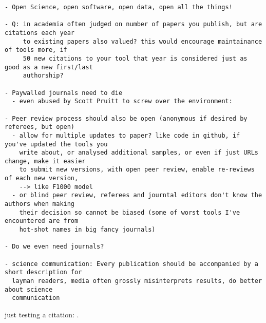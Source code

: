 \begin{verbatim}
- Open Science, open software, open data, open all the things!

- Q: in academia often judged on number of papers you publish, but are citations each year
     to existing papers also valued? this would encourage maintainance of tools more, if
     50 new citations to your tool that year is considered just as good as a new first/last
     authorship?

- Paywalled journals need to die
  - even abused by Scott Pruitt to screw over the environment:

- Peer review process should also be open (anonymous if desired by referees, but open)
  - allow for multiple updates to paper? like code in github, if you've updated the tools you
    write about, or analysed additional samples, or even if just URLs change, make it easier
    to submit new versions, with open peer review, enable re-reviews of each new version,
    --> like F1000 model
  - or blind peer review, referees and journtal editors don't know the authors when making
    their decision so cannot be biased (some of worst tools I've encountered are from
    hot-shot names in big fancy journals)

- Do we even need journals?

- science communication: Every publication should be accompanied by a short description for
  layman readers, media often grossly misinterprets results, do better about science
  communication
\end{verbatim}

just testing a citation: \cite{hiltemann2014ireport}.



